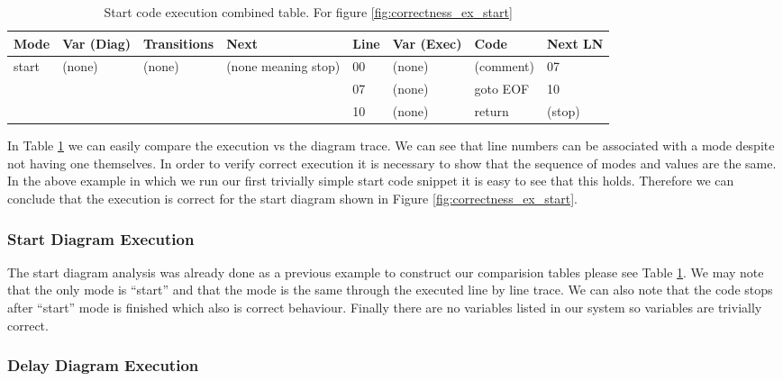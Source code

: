 \begin{table}[htcb]
	\caption{Start code execution combined table. For figure \ref{fig:correctness_ex_start}}
	\centering
	\tablefontsize
		\begin{tabular}{| p{} | p{} | p{} | p{} | p{} | p{} | p{} | p{} |}
			\hline
			\textbf{Mode} 		&	\textbf{Var (Diag)} 		& 	\textbf{Transitions} 		& 	\textbf{Next}		&	\textbf{Line}		&	\textbf{Var (Exec)	}	&	\textbf{Code}	&	\textbf{Next LN} \\
			\hline
			start 				&	(none)						&	(none)						&	(none meaning stop)	&	00					&	(none)					& 	(comment)		&	07 \\
			\hline
								&								&								&						&	07					& 	(none)					& 	goto EOF		& 	10 \\
			\hline
								&								&								&						&	10					&	(none)					&	return			&	(stop) \\
			\hline
		\end{tabular}
	\label{table:BasicExecCombined}
\end{table}

In Table \ref{table:BasicExecCombined} we can easily 
compare the execution vs the diagram trace. 
We can see that line numbers can be associated with 
a mode despite not having one themselves. 
In order to verify correct execution it is necessary to 
show that the sequence of modes and values are the same. 
In the above example in which we run our first trivially 
simple start code snippet it is easy to see that this holds. 
Therefore we can conclude that the execution is 
correct for the start diagram shown in Figure \ref{fig:correctness_ex_start}.

\subsubsection{Start Diagram Execution}

The start diagram analysis was already done as a previous example to 
construct our comparision tables please see Table \ref{table:BasicExecCombined}. 
We may note that the only mode is ``start'' and that the mode is the same 
through the executed line by line trace. We can also note that the code stops after ``start'' 
mode is finished which also is correct behaviour. 
Finally there are no variables listed in
our system so variables are trivially correct.

\subsubsection{Delay Diagram Execution}

